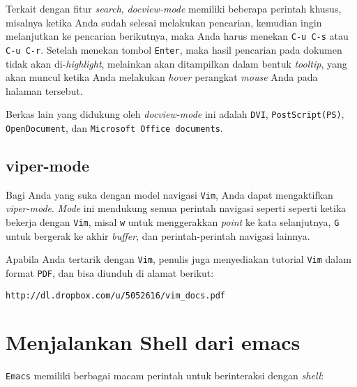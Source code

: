 \documentclass{article}
\begin{document}
Terkait dengan fitur \emph{search}, \emph{docview-mode} memiliki beberapa
perintah khusus, misalnya ketika Anda sudah selesai melakukan pencarian,
kemudian ingin melanjutkan ke pencarian berikutnya, maka Anda harus menekan
\verb=C-u C-s= atau \verb=C-u C-r=. Setelah menekan tombol \verb=Enter=, 
maka hasil pencarian pada dokumen tidak akan di-\emph{highlight}, melainkan
akan ditampilkan dalam bentuk \emph{tooltip}, yang akan muncul ketika Anda
melakukan \emph{hover} perangkat \emph{mouse} Anda pada halaman tersebut.

Berkas lain yang didukung oleh \emph{docview-mode} ini adalah \verb=DVI=, 
\verb=PostScript(PS)=, \verb=OpenDocument=, dan 
\verb=Microsoft Office documents=.

\subsection{viper-mode}
Bagi Anda yang suka dengan model navigasi \verb=Vim=, Anda dapat
mengaktifkan \emph{viper-mode}. \emph{Mode} ini mendukung semua perintah
navigasi seperti seperti ketika bekerja dengan \verb=Vim=, misal \verb=w=
untuk menggerakkan \emph{point} ke kata selanjutnya, \verb=G= untuk bergerak
ke akhir \emph{buffer}, dan perintah-perintah navigasi lainnya.

Apabila Anda tertarik dengan \verb=Vim=, penulis juga menyediakan tutorial
\verb=Vim= dalam format \verb=PDF=, dan bisa diunduh di alamat berikut:

\begin{verbatim}
http://dl.dropbox.com/u/5052616/vim_docs.pdf
\end{verbatim}


\section{Menjalankan Shell dari emacs}
\verb=Emacs= memiliki berbagai macam perintah untuk berinteraksi dengan
\emph{shell}:
\end{document}
